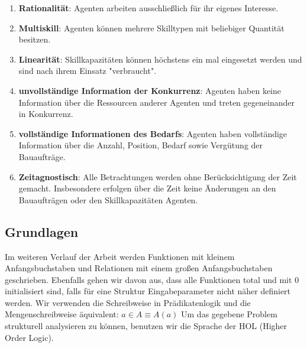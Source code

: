 \begin{enumerate}
  \item \textbf{Rationalität}: Agenten arbeiten ausschließlich für ihr eigenes Interesse.
  \item \textbf{Multiskill}: Agenten können mehrere Skilltypen mit beliebiger Quantität besitzen.
  \item \textbf{Linearität}: Skillkapazitäten können höchstens ein mal eingesetzt werden und sind nach ihrem Einsatz "verbraucht".
  \item \textbf{unvollständige Information der Konkurrenz}: Agenten haben keine Information über die Ressourcen anderer Agenten und treten gegeneinander in Konkurrenz.
  \item \textbf{vollständige Informationen des Bedarfs}: Agenten haben vollständige Information über die Anzahl, Position, Bedarf sowie Vergütung der Bauaufträge.
  \item \textbf{Zeitagnostisch}: Alle Betrachtungen werden ohne Berücksichtigung der Zeit gemacht. Insbesondere erfolgen über die Zeit keine Änderungen an den Bauaufträgen oder den Skillkapazitäten Agenten.
\end{enumerate}

\subsection{Grundlagen}
\label{basics}
  Im weiteren Verlauf der Arbeit werden Funktionen mit kleinem Anfangsbuchstaben und Relationen mit einem großen Anfangsbuchstaben geschrieben. Ebenfalls gehen wir davon aus, dass alle Funktionen total und mit $0$ initialisiert sind, falls für eine Struktur Eingabeparameter nicht näher definiert werden. Wir verwenden die Schreibweise in Prädikatenlogik und die Mengenschreibweise äquivalent: $a\in A \equiv A(a)$
  Um das gegebene Problem strukturell analysieren zu können, benutzen wir die Sprache der HOL (Higher Order Logic).
